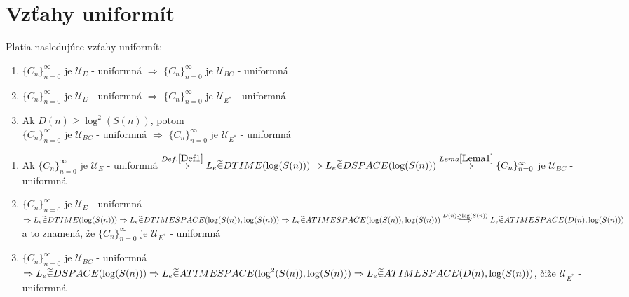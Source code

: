 \section{Vzťahy uniformít}

\begin{veta}
Platia nasledujúce vzťahy uniformít:
\begin{enumerate}
\item $\{C_n\}_{n=0}^{\infty}$ je $\mathcal{U}_E$ - uniformná $\Rightarrow$
$\{C_n\}_{n=0}^{\infty}$ je $\mathcal{U}_{BC}$ - uniformná
\item $\{C_n\}_{n=0}^{\infty}$ je $\mathcal{U}_E$ - uniformná $\Rightarrow$
$\{C_n\}_{n=0}^{\infty}$ je $\mathcal{U}_{E^*}$ - uniformná
\item Ak $D(n)\geq \log^2(S(n))$, potom \\ $\{C_n\}_{n=0}^{\infty}$ je
$\mathcal{U}_{BC}$ - uniformná $\Rightarrow$ $\{C_n\}_{n=0}^{\infty}$ je
$\mathcal{U}_{E^*}$ - uniformná
\end{enumerate}
\end{veta}

\begin{dokaz}

\begin{enumerate}
\item Ak $\{C_n\}_{n=0}^{\infty}$ je $\mathcal{U}_E$ - uniformná
$\overset{Def.\ref{Def1}}{\Longrightarrow} L_e \widetilde{\in} DTIME(\log(S(n)))
\Rightarrow\\ L_e \widetilde{\in} DSPACE(\log(S(n)))
\overset{Lema\ref{Lema1}}{\Longrightarrow}\{C_n\}_{n=0}^{\infty}$ je $\mathcal{U}_{BC}$ -
uniformná
\item $\{C_n\}_{n=0}^{\infty}$ je $\mathcal{U}_E$ - uniformná $\Rightarrow L_e
\widetilde{\in} DTIME(\log(S(n))) \Rightarrow\\ L_e \widetilde{\in}
DTIMESPACE(\log(S(n)),\log(S(n))) \Rightarrow\\ L_e \widetilde{\in}
ATIMESPACE(\log(S(n)),\log(S(n))) \overset{D(n)\geq \log(S(n))}{\Longrightarrow}\\ L_e
\widetilde{\in} ATIMESPACE(D(n),\log(S(n)))$ a to znamená, že $\{C_n\}_{n=0}^{\infty}$ je
$\mathcal{U}_{E^*}$ - uniformná
\item $\{C_n\}_{n=0}^{\infty}$ je $\mathcal{U}_{BC}$ - uniformná $\Rightarrow L_e
\widetilde{\in} DSPACE(\log(S(n))) \Rightarrow\\ L_e \widetilde{\in}
ATIMESPACE(\log^2(S(n)),\log(S(n))) \Rightarrow\\ L_e \widetilde{\in}
ATIMESPACE(D(n),\log(S(n)))$, čiže $\mathcal{U}_{E^*}$ - uniformná
\end{enumerate}

\end{dokaz}

